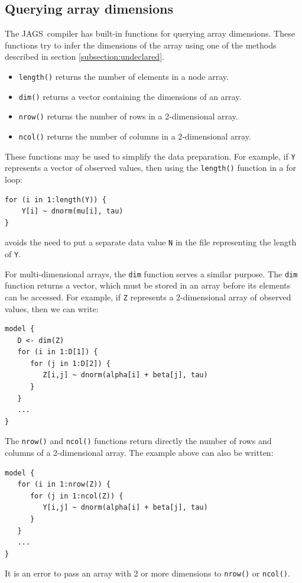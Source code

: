 \documentclass[11pt, a4paper, titlepage]{report}
\newcommand{\JAGS}{\textsf{JAGS}}
\begin{document}
\subsection{Querying array dimensions}  

The \JAGS\ compiler has built-in functions for querying array
dimensions. These functions try to infer the dimensions of the array
using one of the methods described in section
\ref{subsection:undeclared}.

\begin{itemize}
  \item \texttt{length()} returns the number of elements in
    a node array.
  \item \texttt{dim()} returns a vector
    containing the dimensions of an array.
  \item \texttt{nrow()} returns the number of rows in a 2-dimensional
    array.
  \item \texttt{ncol()} returns the number of columns in a
    2-dimensional array.
\end{itemize}

These functions may be used to simplify the data preparation. For
example, if \texttt{Y} represents a vector of observed values, then
using the \texttt{length()} function in a for loop:
\begin{verbatim}
for (i in 1:length(Y)) {
    Y[i] ~ dnorm(mu[i], tau)
}
\end{verbatim}
avoids the need to put a separate data value \verb+N+ in the file
representing the length of \verb+Y+.  

For multi-dimensional arrays, the \verb+dim+ function serves a similar
purpose. The \verb+dim+ function returns a vector, which must be
stored in an array before its elements can be accessed. For example,
if \texttt{Z} represents a 2-dimensional array of observed values, then
we can write:
\begin{verbatim}
model {
   D <- dim(Z)
   for (i in 1:D[1]) {
      for (j in 1:D[2]) {
         Z[i,j] ~ dnorm(alpha[i] + beta[j], tau)
      }
   }
   ...
}
\end{verbatim}
The \texttt{nrow()} and \texttt{ncol()} functions return directly the
number of rows and columns of a 2-dimensional array. The example above
can also be written:
\begin{verbatim}
model {
   for (i in 1:nrow(Z)) {
      for (j in 1:ncol(Z)) {
         Y[i,j] ~ dnorm(alpha[i] + beta[j], tau)
      }
   }
   ...
}
\end{verbatim}
It is an error to pass an array with 2 or more dimensions to
\texttt{nrow()} or \texttt{ncol()}.
\end{document}
